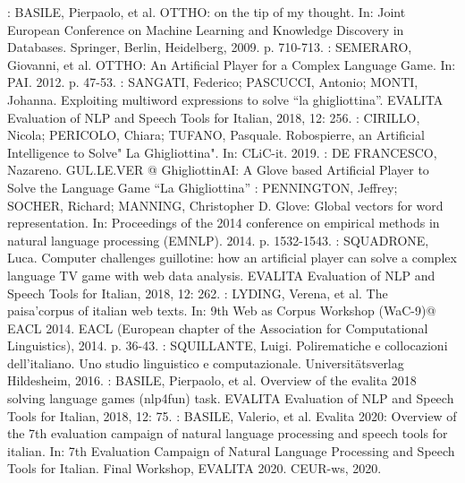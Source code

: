 \documentclass[twoside,twocolumn]{article}
\begin{document}
\begin{thebibliography}{99}
\bibitem[1]: BASILE, Pierpaolo, et al. OTTHO: on the tip of my thought. In: Joint European Conference on Machine Learning and Knowledge Discovery in Databases. Springer, Berlin, Heidelberg, 2009. p. 710-713.
\bibitem[2]: SEMERARO, Giovanni, et al. OTTHO: An Artificial Player for a Complex Language Game. In: PAI. 2012. p. 47-53.
\bibitem[3]: SANGATI, Federico; PASCUCCI, Antonio; MONTI, Johanna. Exploiting multiword expressions to solve “la ghigliottina”. EVALITA Evaluation of NLP and Speech Tools for Italian, 2018, 12: 256.
\bibitem[4]: CIRILLO, Nicola; PERICOLO, Chiara; TUFANO, Pasquale. Robospierre, an Artificial Intelligence to Solve" La Ghigliottina". In: CLiC-it. 2019.
\bibitem[5]: DE FRANCESCO, Nazareno. GUL.LE.VER @ GhigliottinAI: A Glove based Artificial Player to Solve
the Language Game “La Ghigliottina”
\bibitem[6]: PENNINGTON, Jeffrey; SOCHER, Richard; MANNING, Christopher D. Glove: Global vectors for word representation. In: Proceedings of the 2014 conference on empirical methods in natural language processing (EMNLP). 2014. p. 1532-1543.
\bibitem[7]: SQUADRONE, Luca. Computer challenges guillotine: how an artificial player can solve a complex language TV game with web data analysis. EVALITA Evaluation of NLP and Speech Tools for Italian, 2018, 12: 262.
\bibitem[8]: LYDING, Verena, et al. The paisa'corpus of italian web texts. In: 9th Web as Corpus Workshop (WaC-9)@ EACL 2014. EACL (European chapter of the Association for Computational Linguistics), 2014. p. 36-43.
\bibitem[9]: SQUILLANTE, Luigi. Polirematiche e collocazioni dell’italiano. Uno studio linguistico e computazionale. Universitätsverlag Hildesheim, 2016.
\bibitem[10]: BASILE, Pierpaolo, et al. Overview of the evalita 2018 solving language games (nlp4fun) task. EVALITA Evaluation of NLP and Speech Tools for Italian, 2018, 12: 75.
\bibitem[11]: BASILE, Valerio, et al. Evalita 2020: Overview of the 7th evaluation campaign of natural language processing and speech tools for italian. In: 7th Evaluation Campaign of Natural Language Processing and Speech Tools for Italian. Final Workshop, EVALITA 2020. CEUR-ws, 2020.
\end{thebibliography}
\end{document}
